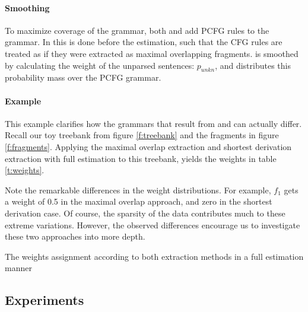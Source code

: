 \paragraph{Smoothing}
To maximize coverage of the grammar, both \ddop{} and \dops{} add PCFG rules to the grammar. In \ddop{} this is done before the estimation, such that the CFG rules are treated as if they were extracted as maximal overlapping fragments. \dops{} is smoothed by calculating the weight of the unparsed sentences: $p_{unkn}$, and distributes this probability mass over the PCFG grammar.




\paragraph{Example}
\FloatBarrier
This example clarifies how the grammars that result from \ddop{} and \dops{} can actually differ. Recall our toy treebank from figure \ref{f:treebank} and the fragments in figure \ref{f:fragments}. 
Applying the maximal overlap extraction and shortest derivation extraction with full estimation to this treebank, yields the weights in table \ref{t:weights}.

Note the remarkable differences in the weight distributions. For example, $f_1$ gets a weight of 0.5 in the maximal overlap approach, and zero in the shortest derivation case. Of course, the sparsity of the data contributes much to these extreme variations. However, the observed differences encourage us to investigate these two approaches into more depth.


\begin{table}[h!]
\center

\caption{The weights assignment according to both extraction methods in a full estimation manner}
\label{t:weights}
\end{table}





\subsection{Experiments}

